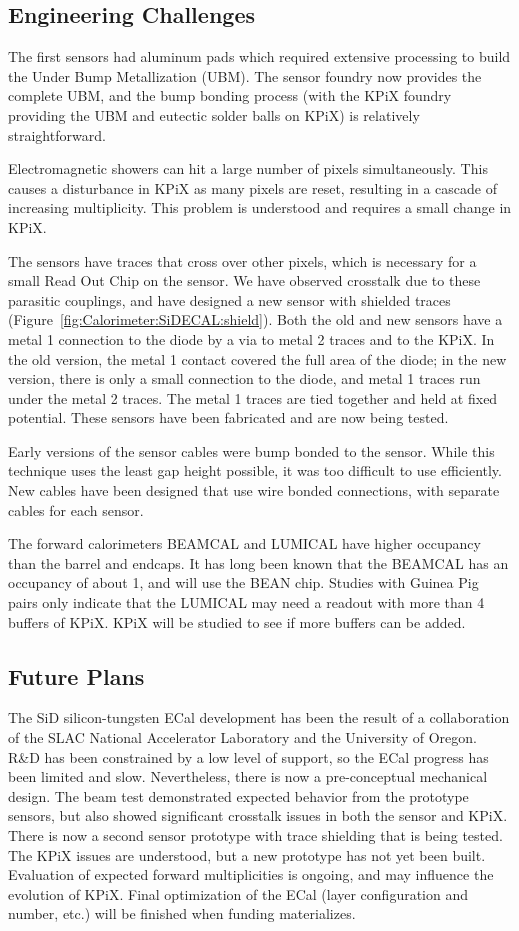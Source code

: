 \subsection{Engineering Challenges}
The first sensors had aluminum pads which required extensive processing to build the Under Bump Metallization (UBM). The sensor foundry now provides the complete UBM, and the bump bonding process (with the KPiX foundry providing the UBM and eutectic solder balls on KPiX) is relatively straightforward.

 Electromagnetic showers can hit a large number of pixels simultaneously. This causes a disturbance in KPiX as many pixels are reset, resulting in a cascade of increasing multiplicity. This problem is understood and requires a small change in KPiX.

 The sensors have traces that cross over other pixels, which is necessary for a small Read Out Chip on the sensor. We have observed crosstalk due to these parasitic couplings, and have designed a new sensor with shielded traces (Figure~\ref{fig:Calorimeter:SiDECAL:shield}). Both the old and new sensors have a metal 1 connection to the diode by a via to metal 2 traces and to the KPiX. In the old version, the metal 1 contact covered the full area of the diode; in the new version, there is only a small connection to the diode, and metal 1 traces run under the metal 2 traces. The metal 1 traces are tied together and held at fixed potential. These sensors have been fabricated and are now being tested.

 Early versions of the sensor cables were bump bonded to the sensor. While this technique uses the least gap height possible, it was too difficult to use efficiently. New cables have been designed that use wire bonded connections, with separate cables for each sensor.

 The forward calorimeters BEAMCAL and LUMICAL have higher occupancy than the barrel and endcaps. It has long been known that the BEAMCAL has an occupancy of about 1, and will use the BEAN\cite{6200898} chip. Studies with Guinea Pig\cite{LCC-0125} pairs only indicate that the LUMICAL may need a readout with more than 4 buffers of KPiX. KPiX will be studied to see if more buffers can be added.

\subsection{Future Plans}
The SiD silicon-tungsten ECal development has been the result of a collaboration of the SLAC National Accelerator Laboratory and the University of Oregon. R\&D has been constrained by a low level of support, so the ECal progress has been limited and slow. Nevertheless, there is now a pre-conceptual mechanical design. The beam test demonstrated expected behavior from the prototype sensors, but also showed significant crosstalk issues in both the sensor and KPiX. There is now a second sensor prototype with trace shielding that is being tested. The KPiX issues are understood, but a new prototype has not yet been built. Evaluation of expected forward multiplicities is ongoing, and may influence the evolution of KPiX.
Final optimization 
of the ECal (layer configuration and number, etc.) will be finished when funding materializes.

